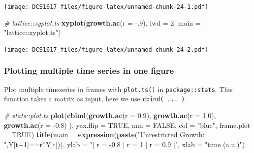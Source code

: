 \documentclass[]{book}
\newenvironment{Shaded}{\begin{snugshade}}{\end{snugshade}}
\newcommand{\KeywordTok}[1]{\textcolor[rgb]{0.13,0.29,0.53}{\textbf{{#1}}}}
\newcommand{\DataTypeTok}[1]{\textcolor[rgb]{0.13,0.29,0.53}{{#1}}}
\newcommand{\DecValTok}[1]{\textcolor[rgb]{0.00,0.00,0.81}{{#1}}}
\newcommand{\FloatTok}[1]{\textcolor[rgb]{0.00,0.00,0.81}{{#1}}}
\newcommand{\StringTok}[1]{\textcolor[rgb]{0.31,0.60,0.02}{{#1}}}
\newcommand{\CommentTok}[1]{\textcolor[rgb]{0.56,0.35,0.01}{\textit{{#1}}}}
\newcommand{\OtherTok}[1]{\textcolor[rgb]{0.56,0.35,0.01}{{#1}}}
\newcommand{\NormalTok}[1]{{#1}}
\begin{document}
\texttt{[image: DCS1617\_files/figure-latex/unnamed-chunk-24-1.pdf]}

\begin{Shaded}
\begin{Highlighting}[]
\CommentTok{# lattice::xyplot.ts}
\KeywordTok{xyplot}\NormalTok{(}\KeywordTok{growth.ac}\NormalTok{(}\DataTypeTok{r =} \NormalTok{-.}\DecValTok{9}\NormalTok{), }\DataTypeTok{lwd =} \DecValTok{2}\NormalTok{, }\DataTypeTok{main =} \StringTok{"lattice::xyplot.ts"}\NormalTok{)}
\end{Highlighting}
\end{Shaded}

\texttt{[image: DCS1617\_files/figure-latex/unnamed-chunk-24-2.pdf]}

\subsubsection*{Plotting multiple time series in one
figure}\label{plotting-multiple-time-series-in-one-figure}

Plot multiple timeseries in frames with \texttt{plot.ts()} in
\texttt{package::stats}. This function takes a matrix as input, here we
use \texttt{cbind(\ ...\ )}.

\begin{Shaded}
\begin{Highlighting}[]
\CommentTok{# stats::plot.ts  }
\KeywordTok{plot}\NormalTok{(}\KeywordTok{cbind}\NormalTok{(}\KeywordTok{growth.ac}\NormalTok{(}\DataTypeTok{r =}  \FloatTok{0.9}\NormalTok{),}
           \KeywordTok{growth.ac}\NormalTok{(}\DataTypeTok{r =}  \FloatTok{1.0}\NormalTok{), }
           \KeywordTok{growth.ac}\NormalTok{(}\DataTypeTok{r =} \NormalTok{-}\FloatTok{0.8}\NormalTok{)}
           \NormalTok{), }
     \DataTypeTok{yax.flip =} \OtherTok{TRUE}\NormalTok{, }\DataTypeTok{ann =} \OtherTok{FALSE}\NormalTok{, }\DataTypeTok{col =} \StringTok{"blue"}\NormalTok{, }\DataTypeTok{frame.plot =} \OtherTok{TRUE}\NormalTok{) }
\KeywordTok{title}\NormalTok{(}\DataTypeTok{main =} \KeywordTok{expression}\NormalTok{(}\KeywordTok{paste}\NormalTok{(}\StringTok{"Unrestricted Growth: "}\NormalTok{,Y[t}\DecValTok{+1}\NormalTok{]==r*Y[t])), }
      \DataTypeTok{ylab =} \StringTok{"|  r = -0.8  |  r = 1  |  r = 0.9  |"}\NormalTok{, }
      \DataTypeTok{xlab =} \StringTok{"time (a.u.)"}\NormalTok{)}
\end{Highlighting}
\end{Shaded}
\end{document}
